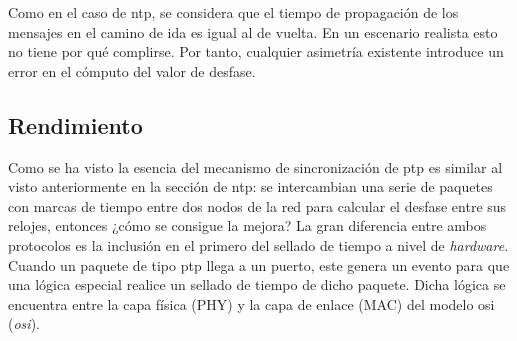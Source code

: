 Como en el caso de \gls{ntp}, se considera que el tiempo de propagación de los 
mensajes en el camino de ida es igual al de vuelta. En un escenario realista 
esto no tiene por qué complirse. Por tanto, cualquier asimetría existente 
introduce un error en el cómputo del valor de desfase.




\subsection{Rendimiento}

Como se ha visto la esencia del mecanismo de sincronización de \gls{ptp} es 
similar al visto anteriormente en la sección de \gls{ntp}: se intercambian una 
serie de paquetes con marcas de tiempo entre dos nodos de la red para calcular 
el desfase entre sus relojes, entonces ¿cómo se consigue la mejora? La gran 
diferencia entre ambos protocolos es la inclusión en el primero del sellado de 
tiempo a nivel de \textit{hardware}. Cuando un paquete de tipo \gls{ptp} llega 
a un puerto, este genera un evento para que una lógica especial realice un 
sellado de tiempo de dicho paquete. Dicha lógica se encuentra entre la capa 
física (PHY) y la capa de enlace (MAC) del modelo \acrshort{osi} 
(\textit{\acrlong{osi}}).



